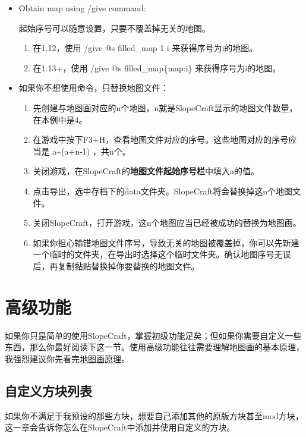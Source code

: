 \documentclass{article}
\begin{document}
   \begin{itemize}
       \item Obtain map using /give command:
       
       起始序号可以随意设置，只要不覆盖掉无关的地图。
       \begin{enumerate}
           \item 在1.12，使用 /give @s filled\_map 1 i 来获得序号为i的地图。
           \item 在1.13+，使用 /give @s filled\_map\{map:i\} 来获得序号为i的地图。
       \end{enumerate}
       \item 如果你不想使用命令，只替换地图文件：
       \begin{enumerate}
           \item 先创建与地图画对应的n个地图，n就是SlopeCraft显示的地图文件数量，在本例中是4。
           \item 在游戏中按下F3+H，查看地图文件对应的序号。这些地图对应的序号应当是 a\textasciitilde(a+n-1) ，共n个。
           \item 关闭游戏，在SlopeCraft的\textbf{地图文件起始序号栏}中填入a的值。
           \item 点击导出，选中存档下的data文件夹。SlopeCraft将会替换掉这n个地图文件。
           \item 关闭SlopeCraft，打开游戏，这n个地图应当已经被成功的替换为地图画。
           \item 如果你担心输错地图文件序号，导致无关的地图被覆盖掉，你可以先新建一个临时的文件夹，在导出时选择这个临时文件夹。确认地图序号无误后，再复制黏贴替换掉你要替换的地图文件。
       \end{enumerate}
   \end{itemize}
   
   \pagebreak
   \section{高级功能}
   如果你只是简单的使用SlopeCraft，掌握初级功能足矣；但如果你需要自定义一些东西，那么你最好阅读下这一节。使用高级功能往往需要理解地图画的基本原理，我强烈建议你先看完\href{https://github.com/ToKiNoBug/SlopeCraftTutorial/blob/main/BasicPrinciple/Principle%20of%20map%20pixel%20arts.md}{地图画原理}。

   \subsection{自定义方块列表}
   如果你不满足于我预设的那些方块，想要自己添加其他的原版方块甚至mod方块，这一章会告诉你怎么在SlopeCraft中添加并使用自定义的方块。
   
\end{document}
